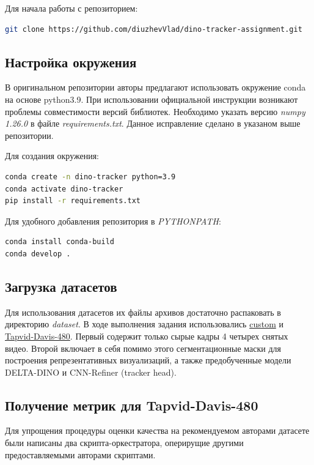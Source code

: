 \documentclass[a4paper, 14pt]{extarticle}
\theoremstyle{definition}
\theoremstyle{plain}
\theoremstyle{remark}
\begin{document}
Для начала работы с репозиторием:
\lstset{style=mystyle}
\begin{lstlisting}[language=bash]
git clone https://github.com/diuzhevVlad/dino-tracker-assignment.git
\end{lstlisting}

\subsection{Настройка окружения}
В оригинальном репозитории авторы предлагают использовать окружение conda на основе python3.9. При использовании официальной инструкции возникают проблемы совместимости версий библиотек. Необходимо указать версию \textit{numpy 1.26.0} в файле \textit{requirements.txt}. Данное исправление сделано в указаном выше репозитории.

Для создания окружения:
\lstset{style=mystyle}
\begin{lstlisting}[language=bash]
conda create -n dino-tracker python=3.9 
conda activate dino-tracker 
pip install -r requirements.txt
\end{lstlisting}

Для удобного добавления репозитория в \textit{PYTHONPATH}:
\begin{lstlisting}[language=bash]
conda install conda-build
conda develop .
\end{lstlisting}

\subsection{Загрузка датасетов}
Для использования датасетов их файлы архивов достаточно распаковать в директорию \textit{dataset}. В ходе выполнения задания использовались \href{https://drive.google.com/file/d/15iur2U_639eWnykylz69-RPGT6p3Ip8u/view?usp=drive_link}{custom} и \href{https://www.dropbox.com/scl/fo/7s2rgsm92qbzzh2xnx51d/AIvXxRaJPL2RQm43Zi_taJU?e=1&preview=davis_480.zip&rlkey=6cs0bm2u0on1u7z0jyxlq8avq&st=7s75r77a&dl=0}{Tapvid-Davis-480}. Первый содержит только сырые кадры 4 четырех снятых видео. Второй включает в себя помимо этого сегментационные маски для построения репрезентативных визуализаций, а также предобученные модели DELTA-DINO и CNN-Refiner (tracker head).

\subsection{Получение метрик для Tapvid-Davis-480}
Для упрощения процедуры оценки качества на рекомендуемом авторами датасете были написаны два скрипта-оркестратора, оперирущие другими предоставляемыми авторами скриптами.
\end{document}

